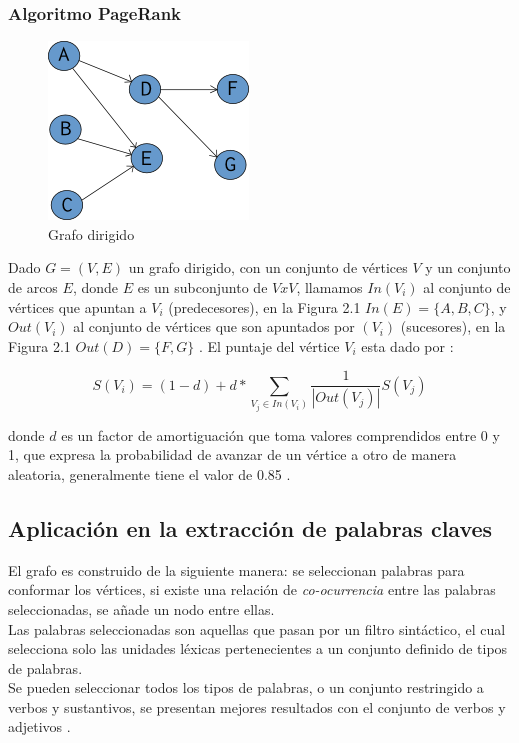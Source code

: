 \subsubsection{Algoritmo PageRank}
\begin{figure}
	\centering
		\includegraphics[]{recursos/img/grafoDirigido.png}
		\caption {Grafo dirigido}
\end{figure}

Dado $G=(V,E)$ un grafo dirigido, con un conjunto de v\'ertices $V$ y un conjunto
de arcos $E$, donde $E$ es un subconjunto de $V x V$, llamamos $In(V_i)$ al
conjunto de v\'ertices que apuntan a $V_i$ (predecesores),  en la Figura 2.1
$In(E)=\{A,B,C\}$, y $Out(V_i)$ al conjunto de v\'ertices que son apuntados por $(V_i)$
(sucesores), en la Figura 2.1 $Out(D)=\{F,G\}$ . El puntaje del v\'ertice $V_i$ 
esta dado por \cite{SBLP98}:

\begin{equation}
	S(V_i) = (1 - d) + d * \sum_{V_j\in In(V_i)}{\frac{1}{|Out(V_j)|}S(V_j)}
\end{equation}

donde $d$ es un factor de amortiguaci\'on que toma valores comprendidos entre
0 y 1, que expresa la probabilidad de avanzar de un v\'ertice a otro de manera
aleatoria, generalmente tiene el valor de 0.85 \cite{SBLP98}.

\subsection{Aplicaci\'on en la extracci\'on de palabras claves}
El grafo es construido de la siguiente manera: se seleccionan palabras  para 
conformar los v\'ertices, si existe una relaci\'on de \emph{co-ocurrencia} entre 
las palabras seleccionadas, se a\~nade un nodo entre ellas. \\

Las palabras seleccionadas son aquellas que pasan por un filtro sint\'actico, el cual
selecciona solo las unidades l\'exicas pertenecientes a un conjunto definido de tipos
de palabras. \\

Se pueden seleccionar todos los tipos de palabras, o un conjunto restringido a verbos
y sustantivos, se presentan mejores resultados con el conjunto de verbos y
adjetivos \cite{RMPT04} .
